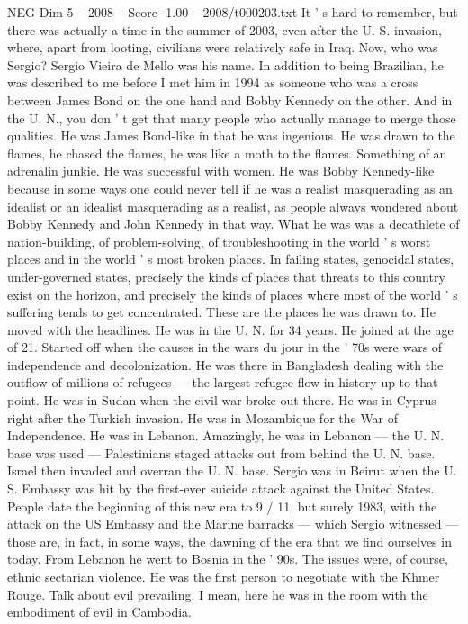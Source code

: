 \begin{textsample}{NEG Dim 5 – 2008 – Score -1.00 – 2008/t000203.txt}
It ' s hard to remember, but there was actually a time in the summer of 2003, even after the U.
S. invasion, where, apart from looting, civilians were relatively safe in Iraq.
Now, who was Sergio?
Sergio Vieira de Mello was his name.
In addition to being Brazilian, he was described to me before I met him in 1994 as someone who was a cross between James Bond on the one hand and Bobby Kennedy on the other.
And in the U.
N., you don ' t get that many people who actually manage to merge those qualities.
He was James Bond-like in that he was ingenious.
He was drawn to the flames, he chased the flames, he was like a moth to the flames.
Something of an adrenalin junkie.
He was successful with women.
He was Bobby Kennedy-like because in some ways one could never tell if he was a realist masquerading as an idealist or an idealist masquerading as a realist, as people always wondered about Bobby Kennedy and John Kennedy in that way.
What he was was a decathlete of nation-building, of problem-solving, of troubleshooting in the world ' s worst places and in the world ' s most broken places.
In failing states, genocidal states, under-governed states, precisely the kinds of places that threats to this country exist on the horizon, and precisely the kinds of places where most of the world ' s suffering tends to get concentrated.
These are the places he was drawn to.
He moved with the headlines.
He was in the U.
N. for 34 years.
He joined at the age of 21.
Started off when the causes in the wars du jour in the ' 70s were wars of independence and decolonization.
He was there in Bangladesh dealing with the outflow of millions of refugees — the largest refugee flow in history up to that point.
He was in Sudan when the civil war broke out there.
He was in Cyprus right after the Turkish invasion.
He was in Mozambique for the War of Independence.
He was in Lebanon.
Amazingly, he was in Lebanon — the U.
N. base was used — Palestinians staged attacks out from behind the U.
N. base.
Israel then invaded and overran the U.
N. base.
Sergio was in Beirut when the U.
S.
Embassy was hit by the first-ever suicide attack against the United States.
People date the beginning of this new era to 9 / 11, but surely 1983, with the attack on the US Embassy and the Marine barracks — which Sergio witnessed — those are, in fact, in some ways, the dawning of the era that we find ourselves in today.
From Lebanon he went to Bosnia in the ' 90s.
The issues were, of course, ethnic sectarian violence.
He was the first person to negotiate with the Khmer Rouge.
Talk about evil prevailing.
I mean, here he was in the room with the embodiment of evil in Cambodia.

\end{textsample}
